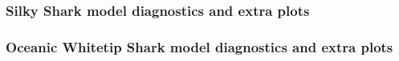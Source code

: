 \documentclass[12pt]{SCreport}
\begin{document}
  
  
 
 
 
 
 
 
 \subsubsection*{Silky Shark model diagnostics and extra plots}
 

\subsubsection*{Oceanic Whitetip Shark model diagnostics and extra plots}

 
  
\end{document}

